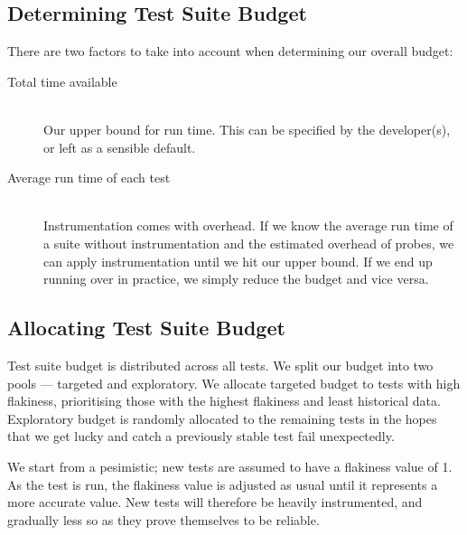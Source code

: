 \subsection{Determining Test Suite Budget}

There are two factors to take into account when determining our overall budget:

\begin{description}
	\item[Total time available] \hfill \\
 		Our upper bound for run time. This can be specified by the developer(s), or left as a sensible default.
	\item[Average run time of each test] \hfill \\
		Instrumentation comes with overhead. If we know the average run time of a suite without instrumentation and the estimated overhead of probes, we can apply instrumentation until we hit our upper bound. If we end up running over in practice, we simply reduce the budget and vice versa.
\end{description}

\subsection{Allocating Test Suite Budget}

Test suite budget is distributed across all tests. We split our budget into two pools --- targeted and exploratory. We allocate targeted budget to tests with high flakiness, prioritising those with the highest flakiness and least historical data. Exploratory budget is randomly allocated to the remaining tests in the hopes that we get lucky and catch a previously stable test fail unexpectedly.

We start from a pesimistic; new tests are assumed to have a flakiness value of 1. As the test is run, the flakiness value is adjusted as usual until it represents a more accurate value. New tests will therefore be heavily instrumented, and gradually less so as they prove themselves to be reliable.


